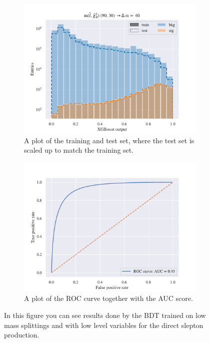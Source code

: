 \begin{figure}[H]
    \centering
    \begin{subfigure}[t!]{0.49\textwidth}
        \includegraphics[width = \textwidth]{Figures/SlepSlep/ML/BDT/Low_level/Low/scaled_train_test_395897.pdf}
        \caption{A plot of the training and test set, where the test set is scaled up to match the training set.}
        \label{fig:traintestscaledExample}
    \end{subfigure}
    \begin{subfigure}[t!]{0.49\textwidth}
        \includegraphics[width = \textwidth]{Figures/SlepSlep/ML/BDT/Low_level/Low/ROCcurve.pdf}
        \caption{A plot of the ROC curve together with the AUC score.}
        \label{fig:ROCExample}
    \end{subfigure}
    \caption{In this figure you can see results done by the BDT trained on low mass splittings and with low level variables for the direct slepton production.}
    \label{fig:resExample}
\end{figure}

